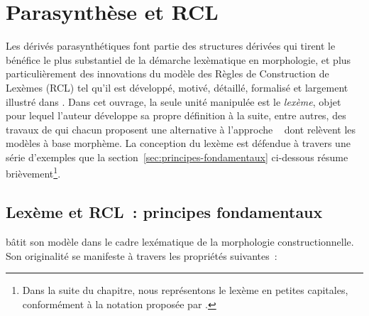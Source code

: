 \documentclass[output=paper]{langsci/langscibook}
\begin{document}
\section{Parasynthèse et RCL}
\label{sec:ML-parasynthetiques}


Les dérivés parasynthétiques font partie des structures dérivées qui tirent le bénéfice le plus substantiel de la démarche lexèmatique en morphologie, et plus particulièrement des innovations du modèle des Règles de Construction de Lexèmes (RCL) tel qu'il est développé, motivé, détaillé, formalisé et largement illustré dans \citet{Fradin03}.  Dans cet ouvrage, la seule unité manipulée est le \emph{lexème}, objet pour lequel l'auteur développe sa propre définition à la suite, entre autres, des travaux de \citet{Anderson92,Aronoff1976,beard1995.LMBM,CarstairsMcCarthy1992,Matthews74,scalise1984.Foris} qui chacun proposent une alternative à l'approche \itemarr\   \citep{hockett1954} dont relèvent les modèles à base morphème.  La conception du lexème est défendue à travers une série d'exemples que la section~\ref{sec:principes-fondamentaux} ci-dessous résume brièvement\footnote{Dans la suite du chapitre, nous représentons le lexème en petites capitales, conformément à la notation proposée par \citet{Matthews74}.}.

\subsection{Lexème et RCL~: principes fondamentaux}
\label{sec:principes-fondamentaux}

\citet{Fradin03} bâtit son modèle dans le cadre lexématique de la morphologie constructionnelle. Son originalité se manifeste à travers les propriétés suivantes~:
\end{document}
